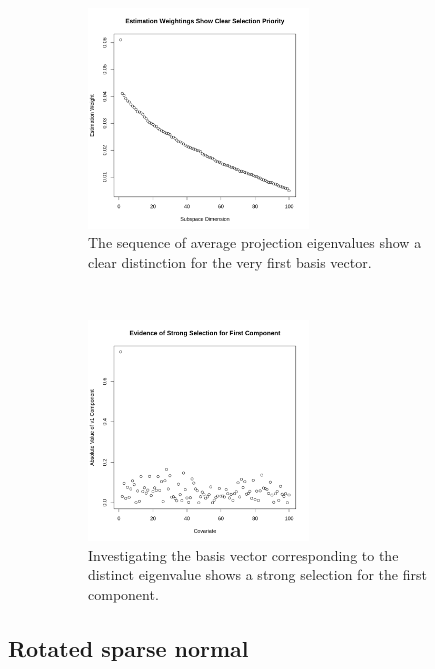 \documentclass[12pt]{article}
\begin{document}
\begin{figure}[t!]
    \begin{subfigure}[t]{0.45\textwidth}
        \centering
        \includegraphics[height=2.3in]{figures/simpleeigs.png}
        \caption{The sequence of average projection eigenvalues show a clear distinction for the very first basis vector.}
    \end{subfigure}
    ~ 
    \begin{subfigure}[t]{0.45\textwidth}
        \centering
        \includegraphics[height=2.3in]{figures/simplecomponents.png}
        \caption{Investigating the basis vector corresponding to the distinct eigenvalue shows a strong selection for the first component.}
    \end{subfigure}
\caption{}
\end{figure}


\subsection{Rotated sparse normal}
\end{document}
